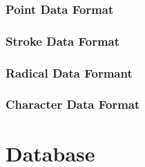 \subsubsection{Point Data Format}
\label{sec:hwre:pointdataformat}

\subsubsection{Stroke Data Format}
\label{sec:hwre:strokedataformat}

\subsubsection{Radical Data Formant}
\label{sec:hwre:radicaldataformat}

\subsubsection{Character Data Format}
\label{sec:hwre:characterdataformat}

\section{Database}
\label{sec:hwre:database}






